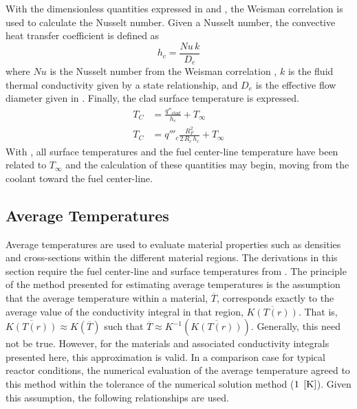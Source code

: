       With the dimensionless quantities expressed in  and
      , the Weisman correlation is used to calculate the Nusselt
      number. Given a Nusselt number, the convective heat transfer coefficient
      is defined as
      \begin{equation}
        \label{eq:hc}
        h_c = \frac{Nu \, k}{D_e}
      \end{equation}
      where $Nu$ is the Nusselt number from the Weisman correlation
      , $k$ is the fluid thermal conductivity given by a state
      relationship, and $D_e$ is the effective flow diameter given in
      . Finally, the clad surface temperature is expressed.
      \begin{align}
        T_C &= \frac{q''_{clad}}{h_c} + T_{\infty} \\
        \label{eq:tc}
        T_C &= q'''_c \frac{R_F^2}{2\,R_c\,h_c} + T_{\infty}
      \end{align}
      With , all surface temperatures and the fuel center-line
      temperature have been related to $T_{\infty}$ and the calculation of these
      quantities may begin, moving from the coolant toward the fuel center-line.

  \subsection{Average Temperatures}
    \label{sec:average_temps}
    Average temperatures are used to evaluate material properties such as
    densities and cross-sections within the different material regions. The
    derivations in this section require the fuel center-line and surface
    temperatures from . The principle of the method
    presented for estimating average temperatures is the assumption that the
    average temperature within a material, $\overline{T}$, corresponds exactly
    to the average value of the conductivity integral in that region,
    $\overline{K(T(r))}$. That is, $\overline{K(T(r))} \approx K(\overline{T})$
    such that $\overline{T} \approx K^{-1}(\overline{K(T(r))})$.
    Generally, this need not be true. However, for the materials and associated
    conductivity integrals presented here, this approximation is valid. In a
    comparison case for typical reactor conditions, the numerical evaluation of
    the average temperature agreed to this method within the tolerance of the
    numerical solution method ($1 \;\left[\text{{K}}\right]$). Given this assumption, the
    following relationships are used.

